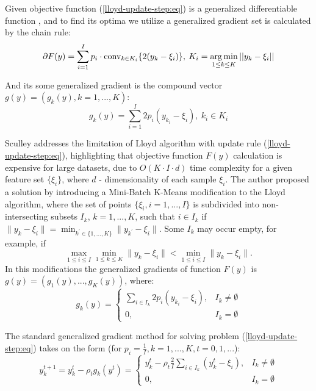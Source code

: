 Given objective function (\ref{lloyd-update-step:eq}) is a generalized differentiable function \cite{Norkin_1986}, and to find its optima we utilize a generalized gradient set is calculated by the chain rule:
\begin{equation}
    \label{lloyd-grad-set:eq}
        \partial F(y) = \sum_{i=1}^I p_i \cdot \text{conv}_{k \in K_i} \{ 2 (y_k - \xi_i) \}, \> K_i = \operatorname*{arg\,min}_{1 \leq k \leq K} || y_k - \xi_i ||
\end{equation}

And its some generalized gradient is the compound vector $ g(y) = (g_k(y), k = 1, ..., K) $:
\begin{equation}
    \label{lloyd-compound-grad:eq}
        g_k(y) = \sum_{i=1}^I 2 p_i (y_{k_i} - \xi_i), \> k_i \in K_i
\end{equation}

Sculley \cite{Sculley_2010} addresses the limitation of Lloyd algorithm with update rule (\ref{lloyd-update-step:eq}), highlighting that objective function $ F(y) $ calculation is expensive for large datasets, due to $ O(K \cdot I \cdot d) $ time complexity for a given feature set $ \{ \xi_i \} $, where $ d $ - dimensionality of each sample $ \xi_i $. The author proposed a solution by introducing a Mini-Batch K-Means modification to the Lloyd algorithm, where the set of points $ \{ \xi_i, i = 1, ..., I \} $ is subdivided into non-intersecting subsets $ I_k $, $ k = 1, ..., K $,  such that $ i \in I_k $ if $ \| y_k - \xi_i \| = \min_{k^\prime \in \{ 1, ..., K \}} \| y_{k^\prime} - \xi_i \| $.  Some $ I_k $ may occur empty, for example, if $$ \max_{1 \leq i \leq I} \min_{1 \leq k \leq K} \|y_k - \xi_i\| < \min_{1 \leq i \leq I} \|y_k - \xi_i\|.$$  In this modifications the generalized gradients of function $F(y)$ is $ g(y) = (g_1(y), ..., g_K(y)) $, where:
\begin{equation}
    \label{lloyd-gen-grad-component:eq}
    g_k(y) = \begin{cases}
        \sum_{i \in I_k} 2 p_i (y_{k_i} - \xi_i), & I_k \neq \emptyset \\
        0, & I_k = \emptyset 
    \end{cases}
\end{equation}

The standard generalized gradient method for solving problem (\ref{lloyd-update-step:eq}) takes on the form (for $ p_i = \frac{1}{I}, k = 1, ..., K, t = 0, 1, ... $):
\begin{equation}
    \label{lloyd-gen-grad:eq}
    y_k^{t+1} = y_k^t - \rho_t g_k(y^t) = \begin{cases}
        y_k^t - \rho_t \frac{2}{I} \sum_{i \in I_k} (y_k^t - \xi_i), & I_k \neq \emptyset \\
        0, & I_k = \emptyset
    \end{cases}
\end{equation}

